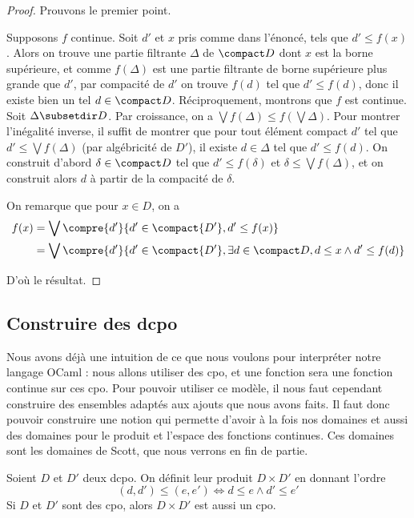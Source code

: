 \begin{proof}
    Prouvons le premier point.
    
    Supposons $f$ continue. Soit $d'$ et $x$ pris comme dans l'énoncé, tels que $d'\leq f(x)$. Alors on trouve une partie filtrante $\Delta$ de $\compact D$ dont $x$ est la borne supérieure, et comme $f(\Delta)$ est une partie filtrante de borne supérieure plus grande que $d'$, par compacité de $d'$ on trouve $f(d)$ tel que $d'\leq f(d)$, donc il existe bien un tel $d\in\compact D$. Réciproquement, montrons que $f$ est continue. Soit $\Delta\subsetdir D$. Par croissance, on a $\bigvee f(\Delta)\leq f(\bigvee\Delta)$. Pour montrer l'inégalité inverse, il suffit de montrer que pour tout élément compact $d'$ tel que $d'\leq \bigvee f(\Delta)$ (par algébricité de $D'$), il existe $d\in\Delta$ tel que $d'\leq f(d)$. On construit d'abord $\delta\in\compact D$ tel que $d'\leq f(\delta)$ et $\delta \leq \bigvee f(\Delta)$, et on construit alors $d$ à partir de la compacité de $\delta$.
    
    On remarque que pour $x\in D$, on a 
    \begin{align*}
        f(x) &= \bigvee \compre{d'}{d'\in\compact{D'}, d'\leq f(x)}\\
        &= \bigvee \compre{d'}{d'\in\compact{D'}, \exists d\in\compact D, d\leq x\land d'\leq f(d)}
    \end{align*}
    
    D'où le résultat.
\end{proof}

\subsection{Construire des dcpo}

Nous avons déjà une intuition de ce que nous voulons pour interpréter notre langage OCaml : nous allons utiliser des cpo, et une fonction sera une fonction continue sur ces cpo. Pour pouvoir utiliser ce modèle, il nous faut cependant construire des ensembles adaptés aux ajouts que nous avons faits. Il faut donc pouvoir construire une notion qui permette d'avoir à la fois nos domaines et aussi des domaines pour le produit et l'espace des fonctions continues. Ces domaines sont les domaines de Scott, que nous verrons en fin de partie.

\begin{defi}
    Soient $D$ et $D'$ deux dcpo. On définit leur produit $D\times D'$ en donnant l'ordre $$(d,d')\leq (e,e')\iff d\leq e\land d'\leq e'$$ Si $D$ et $D'$ sont des cpo, alors $D\times D'$ est aussi un cpo.
\end{defi}

